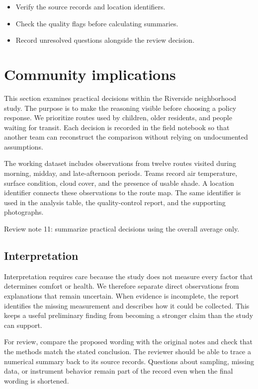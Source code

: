 \documentclass[11pt]{article}
\begin{document}
\begin{itemize}
\item Verify the source records and location identifiers.
\item Check the quality flags before calculating summaries.
\item Record unresolved questions alongside the review decision.
\end{itemize}

\section{Community implications}
This section examines practical decisions within the Riverside neighborhood study. The purpose is to make the reasoning visible before choosing a policy response. We prioritize routes used by children, older residents, and people waiting for transit. Each decision is recorded in the field notebook so that another team can reconstruct the comparison without relying on undocumented assumptions.

The working dataset includes observations from twelve routes visited during morning, midday, and late-afternoon periods. Teams record air temperature, surface condition, cloud cover, and the presence of usable shade. A location identifier connects these observations to the route map. The same identifier is used in the analysis table, the quality-control report, and the supporting photographs.

Review note 11: summarize practical decisions using the overall average only.

\subsection{Interpretation}
Interpretation requires care because the study does not measure every factor that determines comfort or health. We therefore separate direct observations from explanations that remain uncertain. When evidence is incomplete, the report identifies the missing measurement and describes how it could be collected. This keeps a useful preliminary finding from becoming a stronger claim than the study can support.

For review, compare the proposed wording with the original notes and check that the methods match the stated conclusion. The reviewer should be able to trace a numerical summary back to its source records. Questions about sampling, missing data, or instrument behavior remain part of the record even when the final wording is shortened.
\end{document}
